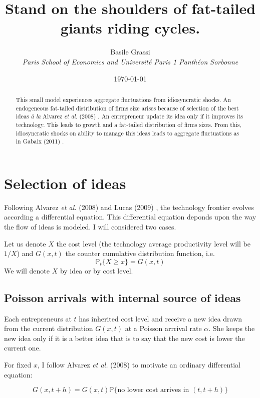 \documentclass[12pt]{article}
\title{Stand on the shoulders of fat-tailed giants riding cycles.}
\author{Basile Grassi\\
\small{\emph{Paris School of Economics and Université Paris 1 Panthéon Sorbonne}}
}
\date{\today}
\begin{document}
\maketitle

\begin{abstract}
This small model experiences aggregate fluctuations from idiosyncratic shocks. An endogeneous fat-tailed distribution of firms size arises because of selection of the best ideas \emph{\`a la} Alvarez \emph{et al.} (2008) \nocite{Alva08}. An entrepreneur update its idea only if it improves its technology. This leads to growth and a fat-tailed distribution of firms sizes. From this, idiosyncratic shocks on ability to manage this ideas leads to aggregate fluctuations as in Gabaix (2011) \nocite{Gaba11}.
\end{abstract}



\section{Selection of ideas}

Following Alvarez \emph{et al.} (2008) \nocite{Alva08} and Lucas (2009) \nocite{Luca09}, the technology frontier evolves according a differential equation. This differential equation deponds upon the way the flow of ideas is modeled. I will considered two cases.

Let us denote $X$ the cost level (the technology average productivity level will be $1/X$) and $G(x,t)$ the counter cumulative distribution function, i.e.
\begin{equation*}
\mathbb{P}_t\{X \geq x\} = G(x,t)
\end{equation*}
We will denote $X$ by idea or by cost level.

\subsection{Poisson arrivals with internal source of ideas}
Each entrepreneurs at $t$ has inherited cost level and receive a new idea drawn from the current distribution $G(x,t)$ at a Poisson arrrival rate $\alpha$. She keeps the new idea only if it is a better idea that is to say that the new cost is lower the current one.

For fixed $x$, I follow Alvarez \emph{et al.} (2008) \nocite{Alva08} to motivate  an ordinary differential equation:

\begin{equation*}
G(x,t+h)=G(x,t)  \mathbb{P} \{ \text{no lower cost arrives in } (t,t+h) \} 
\end{equation*}
\end{document}
